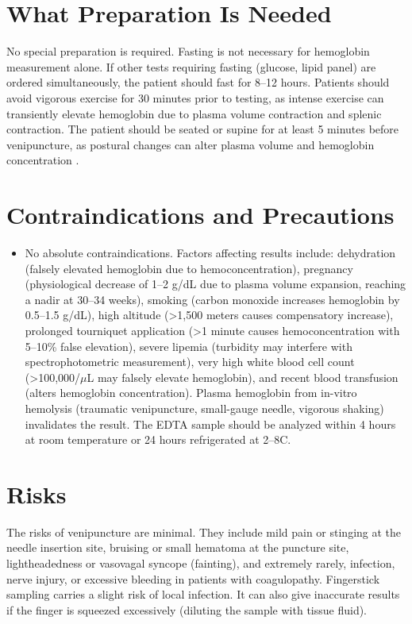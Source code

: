 \section*{What Preparation Is Needed}
No special preparation is required. Fasting is not necessary for hemoglobin measurement alone. If other tests requiring fasting (glucose, lipid panel) are ordered simultaneously, the patient should fast for 8--12 hours. Patients should avoid vigorous exercise for 30 minutes prior to testing, as intense exercise can transiently elevate hemoglobin due to plasma volume contraction and splenic contraction. The patient should be seated or supine for at least 5 minutes before venipuncture, as postural changes can alter plasma volume and hemoglobin concentration \cite{wallach2022interpretation}.

\section*{Contraindications and Precautions}
\begin{itemize}
  \item No absolute contraindications. Factors affecting results include: dehydration (falsely elevated hemoglobin due to hemoconcentration), pregnancy (physiological decrease of 1--2 g/dL due to plasma volume expansion, reaching a nadir at 30--34 weeks), smoking (carbon monoxide increases hemoglobin by 0.5--1.5 g/dL), high altitude (>1,500 meters causes compensatory increase), prolonged tourniquet application (>1 minute causes hemoconcentration with 5--10\% false elevation), severe lipemia (turbidity may interfere with spectrophotometric measurement), very high white blood cell count (>100,000/$\mu$L may falsely elevate hemoglobin), and recent blood transfusion (alters hemoglobin concentration). Plasma hemoglobin from in-vitro hemolysis (traumatic venipuncture, small-gauge needle, vigorous shaking) invalidates the result. The EDTA sample should be analyzed within 4 hours at room temperature or 24 hours refrigerated at 2--8\textdegree{}C.
\end{itemize}
\section*{Risks}
The risks of venipuncture are minimal. They include mild pain or stinging at the needle insertion site, bruising or small hematoma at the puncture site, lightheadedness or vasovagal syncope (fainting), and extremely rarely, infection, nerve injury, or excessive bleeding in patients with coagulopathy. Fingerstick sampling carries a slight risk of local infection. It can also give inaccurate results if the finger is squeezed excessively (diluting the sample with tissue fluid).

